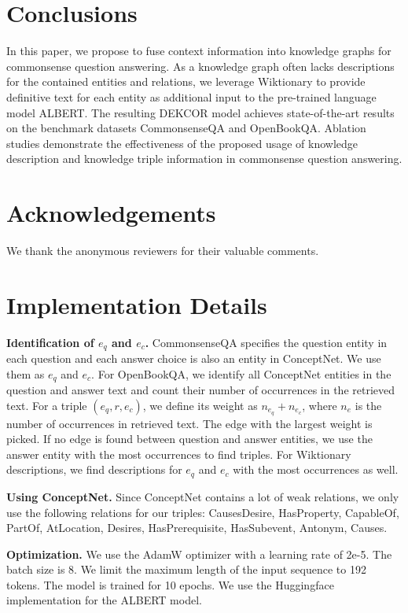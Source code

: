 \documentclass[11pt,a4paper]{article}
\begin{document}
\section{Conclusions}
\label{sec:conclusion}
In this paper, we propose to fuse context information into knowledge graphs for commonsense question answering. As a knowledge graph often lacks descriptions for the contained entities and relations, we leverage Wiktionary to provide definitive text for each entity as additional input to the pre-trained language model ALBERT. The resulting DEKCOR model achieves state-of-the-art results on the benchmark datasets CommonsenseQA and OpenBookQA. Ablation studies demonstrate the effectiveness of the proposed usage of knowledge description and knowledge triple information in commonsense question answering.

\section*{Acknowledgements}
We thank the anonymous reviewers for their valuable comments.




\clearpage
\appendix
\section{Implementation Details}

\noindent \textbf{Identification of $e_q$ and $e_c$.} CommonsenseQA specifies the question entity in each question and each answer choice is also an entity in ConceptNet. We use them as $e_q$ and $e_c$. For OpenBookQA, we identify all ConceptNet entities in the question and answer text and count their number of occurrences in the retrieved text. For a triple $(e_q, r, e_c)$, we define its weight as $n_{e_q}+n_{e_c}$, where $n_e$ is the number of occurrences in retrieved text. The edge with the largest weight is picked. If no edge is found between question and answer entities, we use the answer entity with the most occurrences to find triples. For Wiktionary descriptions, we find descriptions for $e_q$ and $e_c$ with the most occurrences as well.

\noindent \textbf{Using ConceptNet.} Since ConceptNet contains a lot of weak relations, we only use the following relations for our triples: CausesDesire, HasProperty, CapableOf, PartOf, AtLocation, Desires, HasPrerequisite, HasSubevent, Antonym, Causes.

\noindent\textbf{Optimization.}
We use the AdamW \citep{adamw} optimizer with a learning rate of 2e-5. The batch size is 8. We limit the maximum length of the input sequence to 192 tokens. The model is trained for 10 epochs. We use the Huggingface \citep{huggingface} implementation for the ALBERT model.
\end{document}
